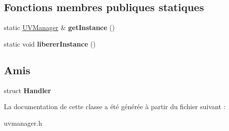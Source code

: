 \subsection*{Fonctions membres publiques statiques}
\begin{DoxyCompactItemize}
\item 
\hypertarget{class_u_v_manager_ac3a0dd0ffad43b2c6a39df72b58d2bb4}{static \hyperlink{class_u_v_manager}{U\+V\+Manager} \& {\bfseries get\+Instance} ()}\label{class_u_v_manager_ac3a0dd0ffad43b2c6a39df72b58d2bb4}

\item 
\hypertarget{class_u_v_manager_a3a547b31583aa76df3056ea32b9f9776}{static void {\bfseries liberer\+Instance} ()}\label{class_u_v_manager_a3a547b31583aa76df3056ea32b9f9776}

\end{DoxyCompactItemize}
\subsection*{Amis}
\begin{DoxyCompactItemize}
\item 
\hypertarget{class_u_v_manager_a7ab9a1e3d1a8ab9a8badf544bf7e0197}{struct {\bfseries Handler}}\label{class_u_v_manager_a7ab9a1e3d1a8ab9a8badf544bf7e0197}

\end{DoxyCompactItemize}


La documentation de cette classe a été générée à partir du fichier suivant \+:\begin{DoxyCompactItemize}
\item 
uvmanager.\+h\end{DoxyCompactItemize}
